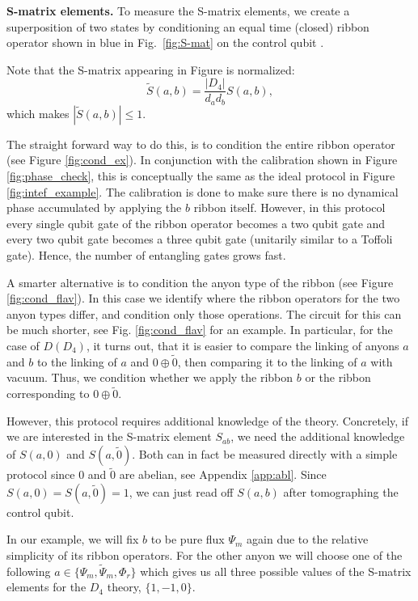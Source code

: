 \documentclass[two column]{article}
\begin{document}
\textbf{S-matrix elements.}
To measure the S-matrix elements, we create a superposition of two states by conditioning an equal time (closed) ribbon operator shown in blue in Fig.~\ref{fig:S-mat} on the control qubit . 





Note that the S-matrix appearing in Figure is normalized:
\begin{equation}
    \tilde{S}(a,b) = \frac{|D_4|}{d_a d_b}S(a,b),
\end{equation}
which makes $|\tilde{S}(a,b)| \leq 1$.



The straight forward way to do this, is to condition the entire ribbon operator (see Figure \ref{fig:cond_ex}).  In conjunction with the calibration shown in Figure \ref{fig:phase_check}, this is conceptually the same as the ideal protocol in Figure \ref{fig:intef_example}. 
The calibration is done to make sure there is no dynamical phase accumulated by applying the $b$ ribbon itself.
However, in this protocol every single qubit gate of the ribbon operator becomes a two qubit gate and every two qubit gate becomes a three qubit gate (unitarily similar to a Toffoli gate). Hence, the number of entangling gates grows fast.

A smarter alternative is to condition the anyon type of the ribbon (see Figure \ref{fig:cond_flav}). In this case we identify where the ribbon operators for the two anyon types differ, and condition only those operations. The circuit for this can be much shorter, see Fig. \ref{fig:cond_flav} for an example. In particular, for the case of $D(D_4)$, it turns out, that it is easier to compare the linking of anyons $a$ and $b$ to the linking of $a$ and $0 \oplus \tilde 0$, then comparing it to the linking of $a$ with vacuum. Thus, we condition whether we apply the ribbon $b$ or the ribbon corresponding to $0 \oplus \tilde 0$. 

However, this protocol requires additional knowledge of the theory. Concretely, if we are interested in the S-matrix element $S_{ab}$, we need the additional knowledge of  $S(a, 0)$ and $S(a, \tilde{0})$. Both can in fact be measured directly with a simple protocol since $0$ and $\tilde{0}$ are abelian, see Appendix \ref{app:abl}.
Since $S(a, 0) = S(a, \tilde{0}) = 1$, we can just read off $S(a,b)$ after tomographing the control qubit.

In our example, we will fix $b$ to be pure flux $\Psi_m$ again due to the relative simplicity of its ribbon operators. For the other anyon we will choose one of the following $a\in\{\Psi_m,\tilde{\Psi}_m, \Phi_r \}$ which gives us all three possible values of the S-matrix elements for the $D_4$ theory, $\{1, -1, 0\}$.
\end{document}
